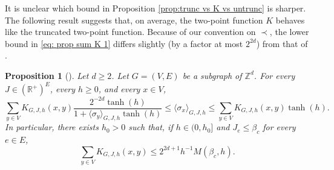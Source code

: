 \documentclass[10pt,a4paper]{amsart}
\numberwithin{equation}{section}
\newtheorem{Prop}[Thm]{Proposition}
\begin{document}
It is unclear which bound in Proposition \ref{prop:trunc vs K vs untrunc} is sharper. The following result suggests that, on average, the two-point function $K$ behaves like the truncated two-point function. Because of our convention on $\prec$, the lower bound in \eqref{eq: prop sum K 1} differs slightly (by a factor at most $2^{2d}$) from that of \cite{AizenmanFernandezCriticalBehaviorMagnetization1986}.
\begin{Prop}[{\hspace{1pt}\cite[Proposition~4.8]{AizenmanFernandezCriticalBehaviorMagnetization1986}}]\label{prop: sum of K} Let $d\geq 2$. Let $G=(V,E)$ be a subgraph of $\mathbb Z^d$. For every $J\in (\mathbb R^+)^E$, every $h\geq 0$, and every $x\in V$,
\begin{equation}\label{eq: prop sum K 1}
	\sum_{y\in V}K_{G,J,h}(x,y)\frac{2^{-2d}\tanh(h)}{1+\langle \sigma_y\rangle_{G,J,h}\tanh(h)}\leq \langle \sigma_x\rangle_{G,J,h}\leq \sum_{y\in V}K_{G,J,h}(x,y)\tanh(h).
\end{equation}
In particular, there exists $h_0>0$ such that, if $h\in (0,h_0]$ and $J_e\leq \beta_c$ for every $e\in E$,  
\begin{equation}\label{eq: prop sum K 2}
	\sum_{y\in V}K_{G,J,h}(x,y)\leq 2^{2d+1}h^{-1}M(\beta_c,h). 
\end{equation}
\end{Prop}
\end{document}
